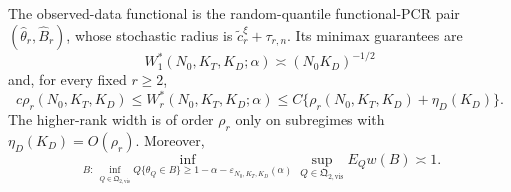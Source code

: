 The observed-data functional is the random-quantile functional-PCR pair \((\widehat\theta_r,\widehat B_r)\), whose stochastic radius is \(\widetilde c_r^\xi+\tau_{r,n}\). Its minimax guarantees are
\[
 W_1^*(N_0,K_T,K_D;\alpha)\asymp(N_0K_D)^{-1/2}
\]
and, for every fixed \(r\ge2\),
\[
 c\rho_r(N_0,K_T,K_D)\le W_r^*(N_0,K_T,K_D;\alpha)
 \le C\{\rho_r(N_0,K_T,K_D)+\eta_D(K_D)\}.
\]
The higher-rank width is of order \(\rho_r\) only on subregimes with \(\eta_D(K_D)=O(\rho_r)\). Moreover,
\[
 \inf_{B:\ \inf_{Q\in\mathfrak Q_{2,\mathrm{vis}}}Q\{\theta_Q\in B\}\ge1-\alpha-\varepsilon_{N_0,K_T,K_D}(\alpha)}
 \sup_{Q\in\mathfrak Q_{2,\mathrm{vis}}}E_Qw(B)\asymp1.
\]